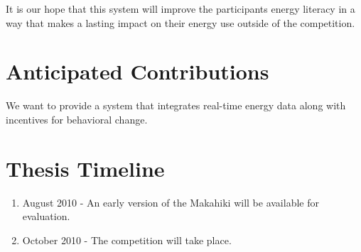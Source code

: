 It is our hope that this system will improve the participants energy literacy in a way that makes a lasting impact on their energy use outside of the competition.

\section{Anticipated Contributions}

We want to provide a system that integrates real-time energy data along with incentives for behavioral change.

\section{Thesis Timeline}

\begin{enumerate}
\item August 2010 - An early version of the Makahiki will be available for evaluation.
\item October 2010 - The competition will take place.
\end{enumerate}